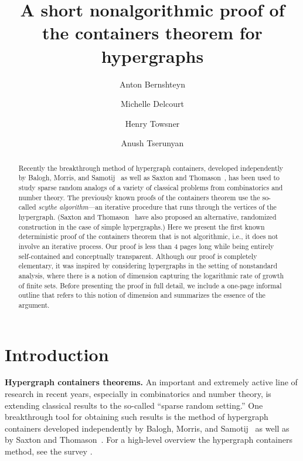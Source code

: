 \documentclass[12pt,reqno]{amsart}
\title{A short nonalgorithmic proof of the containers theorem for hypergraphs}
\author{Anton Bernshteyn}
\author{Michelle Delcourt}
\author{Henry Towsner}
\author{Anush Tserunyan}
\date{}
\theoremstyle{plain}
\theoremstyle{definition}
\theoremstyle{remark}
\newcommand{\0}{\mathbb{\emptyset}}
\begin{document}
\maketitle

\begin{abstract}
	Recently the breakthrough method of hypergraph containers, developed independently by Balogh, Morris, and Samotij~\cite{bms} as well as Saxton and Thomason~\cite{st}, has been used to study sparse random analogs of a variety of classical problems from combinatorics and number theory. The previously known proofs of the containers theorem use the so-called \emph{scythe algorithm}---an iterative procedure that runs through the vertices of the hypergraph. (Saxton and Thomason~\cite{ST_random} have also proposed an alternative, randomized construction in the case of simple hypergraphs.) Here we present the first known deterministic proof of the containers theorem that is not algorithmic, i.e., it does not involve an iterative process. Our proof is less than 4 pages long while being entirely self-contained and conceptually transparent. Although our proof is completely elementary, it was inspired by considering hypergraphs in the setting of nonstandard analysis, where there is a notion of dimension capturing the logarithmic rate of growth of finite sets. Before presenting the proof in full detail, we include a one-page informal outline that refers to this notion of dimension and summarizes the essence of the argument.
\end{abstract}

\section{Introduction}

\noindent\textbf{Hypergraph containers theorems.} An important and extremely active line of research in recent years, especially in combinatorics and number theory, is extending classical results to the so-called ``sparse random setting.'' One breakthrough tool for obtaining such results is the method of hypergraph containers developed independently by Balogh, Morris, and Samotij~\cite{bms} as well as by Saxton and Thomason~\cite{st}. For a high-level overview the hypergraph containers method, see the survey \cite{BMS_survey}.
\end{document}
